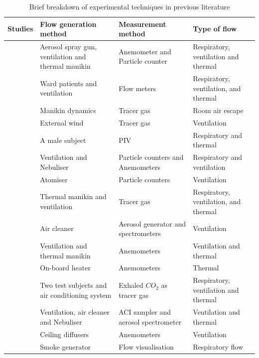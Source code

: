 \documentclass[a4paper,12pt]{elsarticle}
\begin{document}
\begin{longtable}{|m{3.55cm}|m{3.5cm}|m{3.5cm}|m{3.5cm}|}
\caption{Brief breakdown of experimental techniques in previous literature}
\label{tab:exp}\\
    \hline
    \textbf{Studies} & \textbf{Flow generation method} & \textbf{Measurement method} & \textbf{Type of flow}\\
    \hline
    \citet{berrouk2010experimental}& Aerosol spray gun, ventilation and thermal manikin & Anemometer and Particle counter & Respiratory, ventilation and thermal\\
    \hline
    \citet{li2005role} & Ward patients and ventilation & Flow meters & Respiratory, ventilation, and thermal\\
    \hline
    \citet{saarinen2015large} & Manikin dynamics & Tracer gas & Room air escape \\
    \hline
    \citet{jiang2009investigating}& External wind & Tracer gas & Ventilation\\
    \hline
    \citet{faleiros2022tu}& A male subject & PIV & Respiratory and thermal\\
    \hline
    \citet{romano2015numerical}& Ventilation and Nebuliser & Particle counters and Anemometers & Respiratory and ventilation\\
    \hline
    \citet{quintero2022reducing}& Atomiser & Particle counters & Ventilation \\
    \hline
    \citet{hang2015potential}& Thermal manikin and ventilation & Tracer gas & Respiratory, ventilation, and thermal \\
    \hline
    \citet{jain2023numerical}& Air cleaner & Aerosol generator and spectrometers & Ventilation \\
    \hline
    \citet{li2023numerical}& Ventilation and thermal manikin & Anemometers  & Ventilation and thermal \\
    \hline
    \citet{ho2021modeling}& On-board heater & Anemometers & Thermal\\
    \hline
    \citet{deng2021control}& Two test subjects and air conditioning system & Exhaled $CO_2$ as tracer gas & Respiratory, ventilation and thermal\\
    \hline
    \citet{oksanen2022combining}& Ventilation, air cleaner and Nebuliser & ACI sampler and aerosol spectrometer & Ventilation and thermal\\
    \hline
    \citet{arpino2023cfd}& Ceiling diffusers & Anemometers & Ventilation \\
    \hline
    \citet{giri2022colliding}& Smoke generator & Flow visualisation & Respiratory flow\\

\end{longtable}
\end{document}

